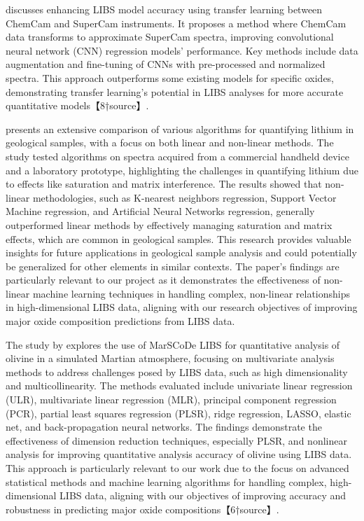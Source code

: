 \citet{kepesImprovingLaserinducedBreakdown2022} discusses enhancing LIBS model accuracy using transfer learning between ChemCam and SuperCam instruments.
It proposes a method where ChemCam data transforms to approximate SuperCam spectra, improving convolutional neural network (CNN) regression models' performance.
Key methods include data augmentation and fine-tuning of CNNs with pre-processed and normalized spectra.
This approach outperforms some existing models for specific oxides, demonstrating transfer learning's potential in LIBS analyses for more accurate quantitative models【8†source】.

\citet{ferreiraComprehensiveComparisonLinear2022} presents an extensive comparison of various algorithms for quantifying lithium in geological samples, with a focus on both linear and non-linear methods.
The study tested algorithms on spectra acquired from a commercial handheld device and a laboratory prototype, highlighting the challenges in quantifying lithium due to effects like saturation and matrix interference.
The results showed that non-linear methodologies, such as K-nearest neighbors regression, Support Vector Machine regression, and Artificial Neural Networks regression, generally outperformed linear methods by effectively managing saturation and matrix effects, which are common in geological samples.
This research provides valuable insights for future applications in geological sample analysis and could potentially be generalized for other elements in similar contexts.
The paper's findings are particularly relevant to our project as it demonstrates the effectiveness of non-linear machine learning techniques in handling complex, non-linear relationships in high-dimensional LIBS data, aligning with our research objectives of improving major oxide composition predictions from LIBS data.

The study by \citet{liuComparisonQuantitativeAnalysis2022} explores the use of MarSCoDe LIBS for quantitative analysis of olivine in a simulated Martian atmosphere, focusing on multivariate analysis methods to address challenges posed by LIBS data, such as high dimensionality and multicollinearity.
The methods evaluated include univariate linear regression (ULR), multivariate linear regression (MLR), principal component regression (PCR), partial least squares regression (PLSR), ridge regression, LASSO, elastic net, and back-propagation neural networks.
The findings demonstrate the effectiveness of dimension reduction techniques, especially PLSR, and nonlinear analysis for improving quantitative analysis accuracy of olivine using LIBS data.
This approach is particularly relevant to our work due to the focus on advanced statistical methods and machine learning algorithms for handling complex, high-dimensional LIBS data, aligning with our objectives of improving accuracy and robustness in predicting major oxide compositions【6†source】.


